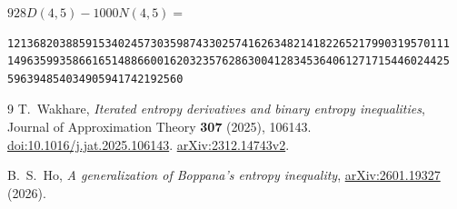 \documentclass[11pt]{article}
\begin{document}
\noindent $928D(4,5)-1000N(4,5)=$
\begin{Verbatim}[fontsize=\footnotesize]
12136820388591534024573035987433025741626348214182265217990319570111
14963599358661651488660016203235762863004128345364061271715446024425
596394854034905941742192560
\end{Verbatim}

\begin{thebibliography}{9}
T.~Wakhare, \emph{Iterated entropy derivatives and binary entropy inequalities},
Journal of Approximation Theory \textbf{307} (2025), 106143.
\href{https://doi.org/10.1016/j.jat.2025.106143}{doi:10.1016/j.jat.2025.106143}.
\href{https://arxiv.org/abs/2312.14743v2}{arXiv:2312.14743v2}.

B.~S.~Ho, \emph{A generalization of Boppana's entropy inequality},
\href{https://arxiv.org/abs/2601.19327}{arXiv:2601.19327} (2026).
\end{thebibliography}
\end{document}
